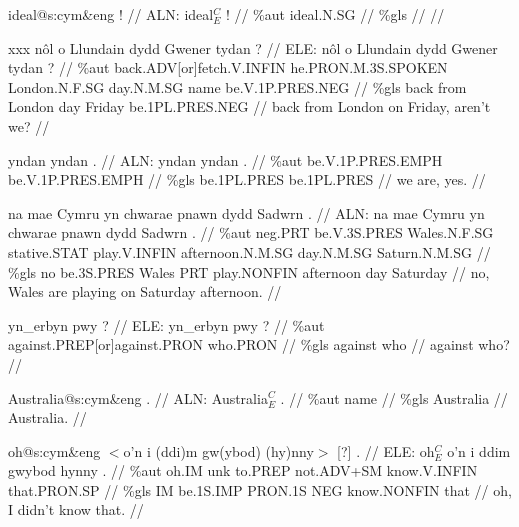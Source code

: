 \documentclass[a4paper,10pt]{article}
\begin{document}
\ex
\begingl[lingstyle=gergl]
\glchat ideal@s:cym\&eng ! //
\glsurface ALN:  ideal$^{C}_{E}$ !  //
\glauto \%aut  ideal{\scriptsize .N.SG}   //
\glmanual \%gls     //
\gleng  //
\endgl
\xe

\ex
\begingl[lingstyle=gergl]
\glchat xxx nôl o Llundain dydd Gwener tydan ? //
\glsurface ELE:  nôl o Llundain dydd Gwener tydan ?  //
\glauto \%aut  back{\scriptsize .ADV[or]fetch.V.INFIN} he{\scriptsize .PRON.M.3S.SPOKEN} London{\scriptsize .N.F.SG} day{\scriptsize .N.M.SG} name be{\scriptsize .V.1P.PRES.NEG}   //
\glmanual \%gls  back from London day Friday be{\scriptsize .1PL.PRES.NEG}   //
\gleng [ \dots ] back from London on Friday, aren't we? //
\endgl
\xe

\ex
\begingl[lingstyle=gergl]
\glchat yndan yndan . //
\glsurface ALN:  yndan yndan .  //
\glauto \%aut  be{\scriptsize .V.1P.PRES.EMPH} be{\scriptsize .V.1P.PRES.EMPH}   //
\glmanual \%gls  be{\scriptsize .1PL.PRES} be{\scriptsize .1PL.PRES}   //
\gleng we are, yes. //
\endgl
\xe

\ex
\begingl[lingstyle=gergl]
\glchat na mae Cymru yn chwarae pnawn dydd Sadwrn . //
\glsurface ALN:  na mae Cymru yn chwarae pnawn dydd Sadwrn .  //
\glauto \%aut  neg{\scriptsize .PRT} be{\scriptsize .V.3S.PRES} Wales{\scriptsize .N.F.SG} stative{\scriptsize .STAT} play{\scriptsize .V.INFIN} afternoon{\scriptsize .N.M.SG} day{\scriptsize .N.M.SG} Saturn{\scriptsize .N.M.SG}   //
\glmanual \%gls  no be{\scriptsize .3S.PRES} Wales PRT play{\scriptsize .NONFIN} afternoon day Saturday   //
\gleng no, Wales are playing on Saturday afternoon. //
\endgl
\xe

\ex
\begingl[lingstyle=gergl]
\glchat yn\_erbyn pwy ? //
\glsurface ELE:  yn\_erbyn pwy ?  //
\glauto \%aut  against{\scriptsize .PREP[or]against.PRON} who{\scriptsize .PRON}   //
\glmanual \%gls  against who   //
\gleng against who? //
\endgl
\xe

\ex
\begingl[lingstyle=gergl]
\glchat Australia@s:cym\&eng . //
\glsurface ALN:  Australia$^{C}_{E}$ .  //
\glauto \%aut  name   //
\glmanual \%gls  Australia   //
\gleng Australia. //
\endgl
\xe

\ex
\begingl[lingstyle=gergl]
\glchat oh@s:cym\&eng $<$o'n i (ddi)m gw(ybod) (hy)nny$>$ [?] . //
\glsurface ELE:  oh$^{C}_{E}$ o'n i ddim gwybod hynny .  //
\glauto \%aut  oh{\scriptsize .IM} unk to{\scriptsize .PREP} not{\scriptsize .ADV+SM} know{\scriptsize .V.INFIN} that{\scriptsize .PRON.SP}   //
\glmanual \%gls  IM be{\scriptsize .1S.IMP} PRON{\scriptsize .1S} NEG know{\scriptsize .NONFIN} that   //
\gleng oh, I didn't know that. //
\endgl
\xe
\end{document}
